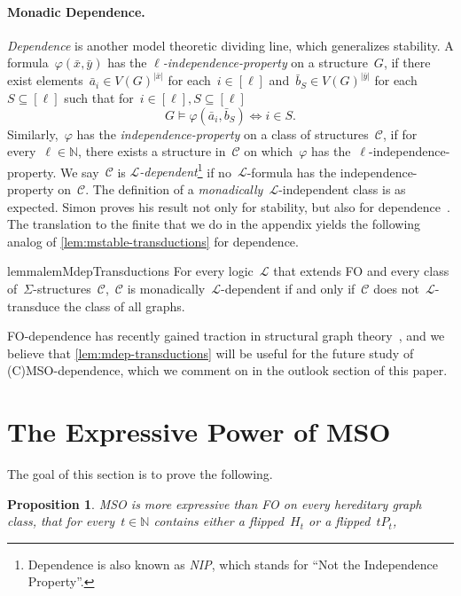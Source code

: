 \documentclass[11pt]{article}      \usepackage[margin=1in]{geometry}  \usepackage{microtype}
\newtheorem{proposition}[theorem]{Proposition}
\theoremstyle{definition}
\newcommand{\N}[0]{\mathrm{\mathbb{N}}}
\renewcommand{\phi}{\varphi}
\newcommand{\LL}{\mathcal{L}}
\newcommand{\CC}{\mathcal{C}}
\begin{document}
\paragraph*{Monadic Dependence.}
\emph{Dependence} is another model theoretic dividing line, which generalizes stability.
A formula~$\phi(\bar x, \bar y)$ has the \emph{$\ell$-independence-property} on a structure~$G$, if there exist elements~$\bar a_i \in V(G)^{|\bar x|}$ for each~$i \in [\ell]$ and~$\bar b_S \in V(G)^{|\bar y|}$ for each~$S \subseteq [\ell]$ such that for~$i \in [\ell], S \subseteq [\ell]$
\[
    G \models \phi(\bar a_i, \bar b_S) \Leftrightarrow i \in S.
\]
Similarly,~$\phi$ has the \emph{independence-property} on a class of structures~$\CC$, if for every~$\ell \in \N$, there exists a structure in~$\CC$ on which~$\phi$ has the~$\ell$-independence-property.
We say~$\CC$ is \emph{$\LL$-dependent}\footnote{Dependence is also known as \emph{NIP}, which stands for ``Not the Independence Property''.} 
if no~$\LL$-formula has the independence-property on~$\CC$.
The definition of a \emph{monadically}~$\LL$-independent class is as expected.
Simon proves his result not only for stability, but also for dependence~\cite{simon2021note}.
The translation to the finite that we do in the appendix yields the following analog of \cref{lem:mstable-transductions} for dependence.

\begin{restatable}{lemma}{lemMdepTransductions}
    \label{lem:mdep-transductions}
    For every logic~$\LL$ that extends FO and every class of~$\Sigma$-structures~$\CC$,~$\CC$ is monadically~$\LL$-dependent if and only if~$\CC$ does not~$\LL$-transduce the class of all graphs.
\end{restatable}

FO-dependence has recently gained traction in structural graph theory~\cite{dreier2024flipbreakability,twwIV,bonnet2022model}, and
we believe that \cref{lem:mdep-transductions} will be useful for the future study of (C)MSO-dependence, which we comment on in the outlook section of this paper.

 
\section{The Expressive Power of MSO}\label{sec:expressiveness}

The goal of this section is to prove the following.

\begin{proposition}\label{prop:sep-fo-mso}
    MSO is more expressive than FO on every hereditary graph class, that for every~$t\in\N$ contains either a flipped~$H_t$ or a flipped~$tP_t$, 
\end{proposition}
\end{document}
